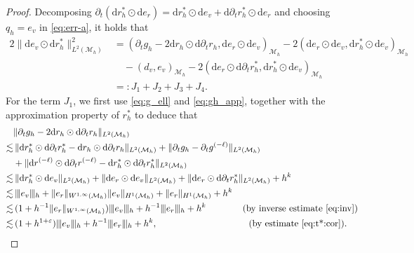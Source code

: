 \documentclass[11pt,a4paper,oneside,reqno]{amsart}
\theoremstyle{definition}
\theoremstyle{plain}
\numberwithin{theorem}{section}
\numberwithin{proposition}{section}
\numberwithin{lemma}{section}
\numberwithin{equation}{section}
\newcommand{\Man}{\mathcal{M}}
\newcommand{\normt}[1]{%
	\vert\kern-0.9pt\vert\kern-0.9pt\vert #1
	\vert\kern-0.9pt\vert\kern-0.9pt\vert}
\begin{document}
\begin{proof}
Decomposing 
$ \partial_t( \mathrm{d} r_h^* \odot\mathrm{d} e_r) =  \mathrm{d} r_h^* \odot\mathrm{d} e_v 
+  \mathrm{d} \partial_t r_h^* \odot\mathrm{d} e_r $ and choosing $q_h = e_{v}$ in \eqref{eq:err-a}, 
it holds that
\[ 
\begin{aligned}
    2\|\mathrm{d} e_{v} \odot \mathrm{d} r_h^{*}\|_{L^2(\Man_h)}^2 
&=(\partial_t g_h - 2 \mathrm{d} r_h \odot \mathrm{d} \partial_t r_h, \mathrm{d} e_{r} \odot \mathrm{d} e_{v} )_{\Man_h}
- 2 ( \mathrm{d} e_{r} \odot \mathrm{d} e_{v}, \mathrm{d} r_h^{*} \odot \mathrm{d} e_{v} )_{\Man_h} \\
&\quad  - ( d_v, e_{v} )_{\Man_h}
- 2 ( \mathrm{d} e_{r} \odot \mathrm{d} \partial_t r_h^{*}, \mathrm{d} r_h^{*} \odot \mathrm{d} e_{v})_{\Man_h}\\ 
& =: J_1 + J_2 + J_3 + J_4.
\end{aligned}
\]
For the term $J_1$, we first use \eqref{eq:g_ell} and \eqref{eq:gh_app}, together with the approximation property of $r_h^*$ to deduce that 
\begin{equation}\label{eq:pt_gh-drhdrh} 
\begin{aligned}
   & \| \partial_t g_h - 2 \mathrm{d} r_h \odot \mathrm{d} \partial_t r_h \|_{L^2(\Man_h)} \\ 
 \lesssim &\, \|\mathrm{d}r_h^*\odot\mathrm{d}\partial_t r_h^* - \mathrm{d}r_h\odot\mathrm{d}\partial_t r_h\|_{L^2(\Man_h)} + \| \partial_t g_h -  \partial_t g^{(-\ell)}  \|_{L^2(\Man_h)} \\ 
 & + \| \mathrm{d}r^{(-\ell)}\odot\mathrm{d}\partial_t r^{(-\ell)}
 - \mathrm{d} r_h^* \odot \mathrm{d} \partial_t r_h^*\|_{L^2(\Man_h)} \\ 
\lesssim &\,  \| \mathrm{d} r_h^{*} \odot \mathrm{d} e_{v}  \|_{L^2(\Man_h)}
+ \|\mathrm{d} e_{r} \odot \mathrm{d} e_{v} \|_{L^2(\Man_h)} 
+ \|\mathrm{d} e_{r} \odot \mathrm{d} \partial_t r_h^{*}\|_{L^2(\Man_h)} + h^k \\ 
\lesssim & 
\, \normt{ e_v }_{h} + \| e_r \|_{W^{1,\infty}(\Man_h)} \| e_v \|_{H^1(\Man_h)} 
+ \| e_r \|_{H^1(\Man_h)} + h^k\\
\lesssim & \, 
(1 + h^{-1}\|e_r\|_{W^{1, \infty}(\Man_h)})\normt{ e_v }_{h} + h^{-1} \normt{e_r}_h + h^k 
\quad\quad\quad\quad (\text{by inverse estimate \eqref{eq:inv}})
\\ 
\lesssim &
\, (1 + h^{1+\varepsilon})\normt{ e_v }_{h} + h^{-1} \normt{e_r}_h + h^k,
\qquad\qquad\qquad\qquad\qquad
 (\text{by estimate \eqref{eq:t*:cor}}). 
\end{aligned}

\end{equation}
\end{proof}
\end{document}
